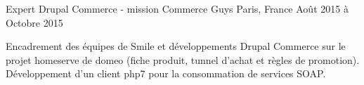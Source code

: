 \cventry
{Expert Drupal Commerce - mission} %
{Commerce Guys} %
{Paris, France} %
{Août 2015 à Octobre 2015} %
{
\begin{cvitems} %
    \item
    {
    Encadrement des équipes de Smile et développements Drupal Commerce sur le projet
    homeserve de domeo (fiche produit, tunnel d'achat et règles de promotion).
    Développement d'un client php7 pour la consommation de services SOAP.
    }
\end{cvitems}
}
